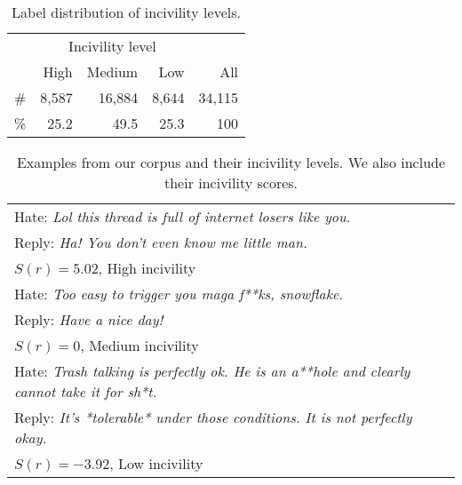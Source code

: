 \documentclass[11pt]{article}
\begin{document}
	\begin{table}
		\centering
		\begin{tabular}{lrrrr}
			\toprule
			& \multicolumn{3}{c}{Incivility level} \\ \cmidrule{2-4} 
			\multicolumn{1}{c}{} & High & Medium & Low & All \\
			\hline
			\addlinespace[1pt]
			\# & 8,587 & 16,884 & 8,644 & 34,115 \\ 
			\% & 25.2 & 49.5 & 25.3 & 100 \\
			\bottomrule
		\end{tabular}
		\caption{Label distribution of incivility levels.}
		\label{t:label-distribution}
	\end{table}
	
	\begin{table}[t]
		\small
		\centering
		\begin{tabular}{p{7.2cm}}
			\toprule
			Hate: \emph{Lol this thread is full of internet losers like you.} \\
			Reply: \emph{Ha! You don't even know me little man.}\\ \addlinespace
			$S(r) = 5.02$, High incivility\\ 	
			\midrule
			Hate: \emph{Too easy to trigger you maga f**ks, snowflake.} \\
			Reply: \emph{Have a nice day!}\\ \addlinespace
			$S(r) = 0$, Medium incivility\\ 					
			\midrule
			Hate: \emph{Trash talking is perfectly ok. He is an a**hole and clearly cannot take it for sh*t.} \\
			Reply: \emph{It's *tolerable* under those conditions. It is not perfectly okay.}\\ \addlinespace
			$S(r) = -3.92$, Low incivility\\ 
			\bottomrule
		\end{tabular}
		
		\caption{Examples from our corpus and their incivility levels.
			We also include their incivility scores.}
		\label{t:corpus-examples}
	\end{table}
\end{document}

